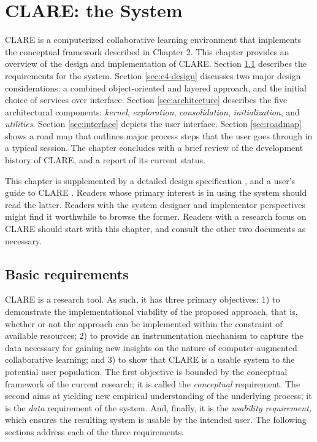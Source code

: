 
\setcounter{chapter}{3}
\chapter{CLARE: the System}
\label{sec:clare}

CLARE is a computerized collaborative learning environment that implements
the conceptual framework described in Chapter 2. This chapter provides an
overview of the design and implementation of CLARE. Section
\ref{sec:requirements} describes the requirements for the system. Section
\ref{sec:c4-design} discusses two major design considerations: a combined
object-oriented and layered approach, and the initial choice of services
over interface. Section \ref{sec:architecture} describes the five
architectural components: {\it kernel\/}, {\it exploration\/}, {\it
consolidation\/}, {\it initialization\/}, and {\it utilities\/}. Section
\ref{sec:interface} depicts the user interface. Section \ref{sec:roadmap}
shows a road map that outlines major process steps that the user goes
through in a typical session. The chapter concludes with a brief review of
the development history of CLARE, and a report of its current status.

This chapter is supplemented by a detailed design specification
\cite{csdl-93-24}, and a user's guide to CLARE \cite{csdl-93-15}. Readers
whose primary interest is in using the system should read the latter.
Readers with the system designer and implementor perspectives might find it
worthwhile to browse the former.  Readers with a research focus on CLARE
should start with this chapter, and consult the other two documents as
necessary.


\section{Basic requirements}
\label{sec:requirements}

CLARE is a research tool. As such, it has three primary objectives: 1) to
demonstrate the implementational viability of the proposed approach, that
is, whether or not the approach can be implemented within the constraint of
available resources; 2) to provide an instrumentation mechanism to capture
the data necessary for gaining new insights on the nature of
computer-augmented collaborative learning; and 3) to show that CLARE is a
usable system to the potential user population. The first objective is
bounded by the conceptual framework of the current research; it is called
the {\it conceptual\/} requirement. The second aims at yielding new
empirical understanding of the underlying process; it is the {\it data}
requirement of the system. And, finally, it is the {\it usability
requirement,\/} which ensures the resulting system is usable by the
intended user. The following sections address each of the three
requirements.


